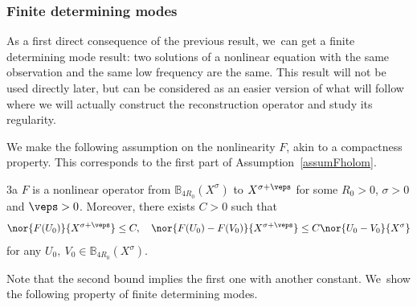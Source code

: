 \subsubsection{Finite determining modes}
As a first direct consequence of the previous result, we~can get a finite determining mode result: two solutions of a nonlinear equation with the same observation and the same low frequency are the same. This result will not be used directly later, but can be considered as an easier version of what will follow where we will actually construct the reconstruction operator and study its regularity.

We make the following assumption on the nonlinearity $F$, akin to a compactness property. This corresponds to the first part of Assumption~\ref{assumFholom}.

\begin{assump}{3a}
\label{assumF}
$F$ is a nonlinear operator from $\mathbb{B}_{4R_{0}}(X^{\sigma})$ to $X^{\sigma+\veps}$ for some $R_{0}>0$, $\sigma>0$ and $\veps>0$. Moreover, there exists $C>0$ such that
\begin{align}
\label{boundF}
\nor{F(U_{0})}{X^{\sigma+\veps}}\leq C,\quad \nor{F(U_{0})-F(V_{0})}{X^{\sigma+\veps}}\leq C \nor{U_{0}-V_{0}}{X^{\sigma}}
\end{align}
for any $U_{0},~V_{0}\in \mathbb{B}_{4R_{0}}(X^{\sigma})$.
\end{assump}

Note that the second bound implies the first one with another constant. We~show the following property of finite determining modes.

